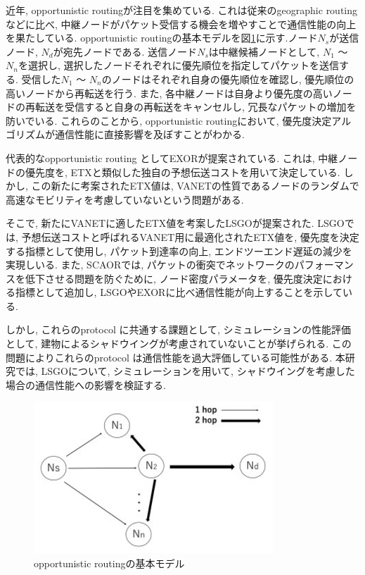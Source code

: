 \documentclass[technicalreport]{ieicej}
\begin{document}
近年, opportunistic routingが注目を集めている. これは従来のgeographic routing \cite{GPSR}\cite{GPCR}などに比べ, 中継ノードがパケット受信する機会を増やすことで通信性能の向上を果たしている. opportunistic routingの基本モデルを図\ref{fig:Basic}に示す.ノード$N_{s}$が送信ノード, $N_{d}$が宛先ノードである. 送信ノード$N_{s}$は中継候補ノードとして, $N_{1}$ ～ $N_{n}$を選択し, 選択したノードそれぞれに優先順位を指定してパケットを送信する. 受信した$N_{1}$ ～ $N_{n}$のノードはそれぞれ自身の優先順位を確認し, 優先順位の高いノードから再転送を行う. また, 各中継ノードは自身より優先度の高いノードの再転送を受信すると自身の再転送をキャンセルし, 冗長なパケットの増加を防いでいる. これらのことから, opportunistic routingにおいて, 優先度決定アルゴリズムが通信性能に直接影響を及ぼすことがわかる.\par
代表的なopportunistic routing としてEXOR\cite{EXOR}が提案されている. これは, 中継ノードの優先度を, ETX\cite{ETX}と類似した独自の予想伝送コストを用いて決定している. しかし, この新たに考案されたETX値は, VANETの性質であるノードのランダムで高速なモビリティを考慮していないという問題がある.\par
そこで, 新たにVANETに適したETX値を考案したLSGO\cite{LSGO}が提案された. LSGOでは, 予想伝送コストと呼ばれるVANET用に最適化されたETX値を, 優先度を決定する指標として使用し, パケット到達率の向上, エンドツーエンド遅延の減少を実現しいる. また, SCAOR\cite{SCAOR}では, パケットの衝突でネットワークのパフォーマンスを低下させる問題を防ぐために, ノード密度パラメータを, 優先度決定における指標として追加し, LSGOやEXORに比べ通信性能が向上することを示している.\par
 しかし, これらのprotocol に共通する課題として, シミュレーションの性能評価として, 建物によるシャドウイングが考慮されていないことが挙げられる. この問題によりこれらのprotocol は通信性能を過大評価している可能性がある. 本研究では, LSGOについて, シミュレーションを用いて, シャドウイングを考慮した場合の通信性能への影響を検証する. 
 \begin{figure}[!ht]
\centering
\includegraphics[width=90mm]{figures/basic-opportunity.eps}
\caption{opportunistic routingの基本モデル}
\label{fig:Basic}
\end{figure}
\end{document}
